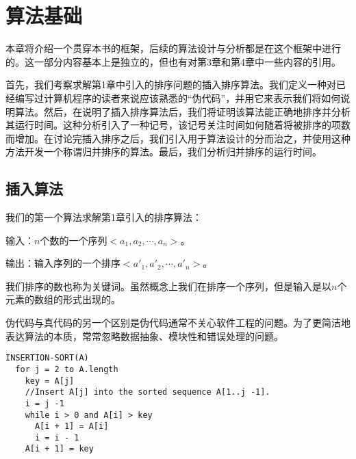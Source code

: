 \chapter{算法基础}
本章将介绍一个贯穿本书的框架，后续的算法设计与分析都是在这个框架中进行的。这一部分内容基本上是独立的，但也有对第3章和第4章中一些内容的引用。
\par 首先，我们考察求解第1章中引入的排序问题的插入排序算法。我们定义一种对已经编写过计算机程序的读者来说应该熟悉的“伪代码”，并用它来表示我们将如何说明算法。然后，在说明了插入排序算法后，我们将证明该算法能正确地排序并分析其运行时间。这种分析引入了一种记号，该记号关注时间如何随着将被排序的项数而增加。在讨论完插入排序之后，我们引入用于算法设计的分而治之，并使用这种方法开发一个称谓归并排序的算法。最后，我们分析归并排序的运行时间。
\section{插入算法}
我们的第一个算法求解第1章引入的排序算法： 
\par 输入：$n$个数的一个序列$<a_1,a_2, \cdots, a_n>$。
\par 输出：输入序列的一个排序$<a'_1, a'_2, \cdots,a'_n>$。
\par 我们排序的数也称为关键词。虽然概念上我们在排序一个序列，但是输入是以$n$个元素的数组的形式出现的。
\par 伪代码与真代码的另一个区别是伪代码通常不关心软件工程的问题。为了更简洁地表达算法的本质，常常忽略数据抽象、模块性和错误处理的问题。
\begin{verbatim}
INSERTION-SORT(A)
  for j = 2 to A.length
    key = A[j]
    //Insert A[j] into the sorted sequence A[1..j -1].
    i = j -1
    while i > 0 and A[i] > key
      A[i + 1] = A[i]
      i = i - 1
    A[i + 1] = key
\end{verbatim}